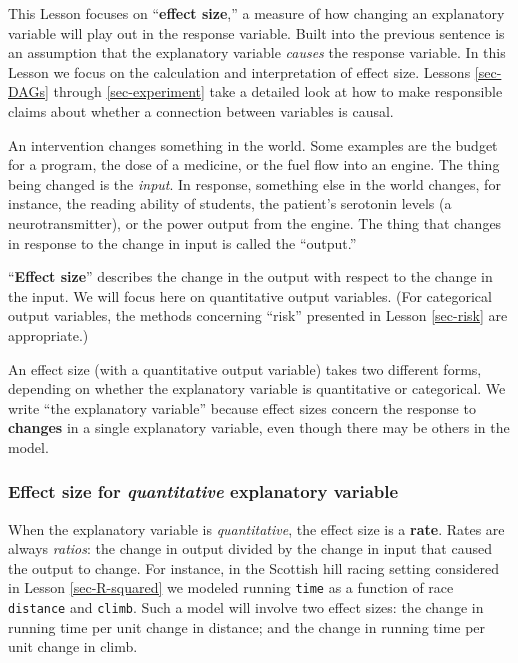 \documentclass[
  letterpaper,
  DIV=11,
  numbers=noendperiod,
  oneside]{scrartcl}
\begin{document}
This Lesson focuses on ``\textbf{effect size},'' a measure of how
changing an explanatory variable will play out in the response variable.
Built into the previous sentence is an assumption that the explanatory
variable \emph{causes} the response variable. In this Lesson we focus on
the calculation and interpretation of effect size. Lessons
\ref{sec-DAGs} through \ref{sec-experiment} take a detailed look at how
to make responsible claims about whether a connection between variables
is causal.

An intervention changes something in the world. Some examples are the
budget for a program, the dose of a medicine, or the fuel flow into an
engine. The thing being changed is the \emph{input}. In response,
something else in the world changes, for instance, the reading ability
of students, the patient's serotonin levels (a neurotransmitter), or the
power output from the engine. The thing that changes in response to the
change in input is called the ``output.''

``\textbf{Effect size}'' describes the change in the output with respect
to the change in the input. We will focus here on quantitative output
variables. (For categorical output variables, the methods concerning
``risk'' presented in Lesson \ref{sec-risk} are appropriate.)

An effect size (with a quantitative output variable) takes two different
forms, depending on whether the explanatory variable is quantitative or
categorical. We write ``the explanatory variable'' because effect sizes
concern the response to \textbf{changes} in a single explanatory
variable, even though there may be others in the model.

\subsubsection{\texorpdfstring{Effect size for \emph{quantitative}
explanatory
variable}{Effect size for quantitative explanatory variable}}\label{sec-effect-calc}

When the explanatory variable is \emph{quantitative}, the effect size is
a \textbf{rate}. Rates are always \emph{ratios}: the change in output
divided by the change in input that caused the output to change. For
instance, in the Scottish hill racing setting considered in Lesson
\ref{sec-R-squared} we modeled running \texttt{time} as a function of
race \texttt{distance} and \texttt{climb}. Such a model will involve two
effect sizes: the change in running time per unit change in distance;
and the change in running time per unit change in climb.
\end{document}
